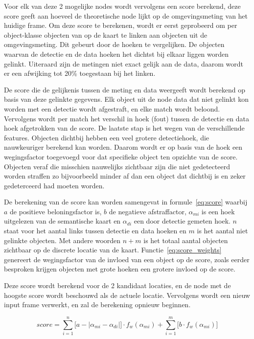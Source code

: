 Voor elk van deze 2 mogelijke nodes wordt vervolgens een score berekend, deze score geeft aan hoeveel de theoretische node lijkt op de omgevingsmeting van het huidige frame.
Om deze score te berekenen, wordt er eerst geprobeerd om per object-klasse objecten van op de kaart te linken aan objecten uit de omgevingsmeting.
Dit gebeurt door de hoeken te vergelijken.
De objecten waarvan de detectie en de data hoeken het dichtst bij elkaar liggen worden gelinkt.
Uiteraard zijn de metingen niet exact gelijk aan de data, daarom wordt er een afwijking tot 20\% toegestaan bij het linken.

De score die de gelijkenis tussen de meting en data weergeeft wordt berekend op basis van deze gelinkte gegevens.
Elk object uit de node data dat niet gelinkt kon worden met een detectie wordt afgestraft, en elke match wordt beloond.
Vervolgens wordt per match het verschil in hoek (fout) tussen de detectie en data hoek afgetrokken van de score.
De laatste stap is het wegen van de verschillende features. Objecten dichtbij hebben een veel grotere detectiehoek, die nauwkeuriger berekend kan worden.
Daarom wordt er op basis van de hoek een wegingsfactor toegevoegd voor dat specifieke object ten opzichte van de score.
Objecten veraf die misschien nauwelijks zichtbaar zijn die niet gedetecteerd worden straffen zo bijvoorbeeld minder af dan een object dat dichtbij is en zeker gedeterceerd had moeten worden.

De berekening van de score kan worden samengevat in formule~\ref{eq:score} waarbij $a$ de positieve beloningsfactor is, $b$ de negatieve afstraffactor,
$\alpha_{mi}$ is een hoek uitgelezen van de semantische kaart en $\alpha_{di}$ een door detectie gemeten hoek.
$n$ staat voor het aantal links tussen detectie en data hoeken en $m$ is het aantal niet gelinkte objecten.
Met andere woorden $n + m$ is het totaal aantal objecten zichtbaar op de discrete locatie van de kaart.
Functie~\ref{eq:score_weights} genereert de wegingsfactor van de invloed van een object op de score, zoals eerder besproken krijgen objecten met grote hoeken
een grotere invloed op de score.

Deze score wordt berekend voor de 2 kandidaat locaties, en de node met de hoogste score wordt beschouwd als de actuele locatie.
Vervolgens wordt een nieuw input frame verwerkt, en zal de berekening opnieuw beginnen.

\begin{equation}\label{eq:score}
    score = \sum_{i=1}^{n}\big[a - |\alpha_{mi} - \alpha_{di}|\big] \cdot f_w(\alpha_{mi}) + \sum_{i=1}^{m}\big[b \cdot f_w(\alpha_{mi})\big]
\end{equation}

